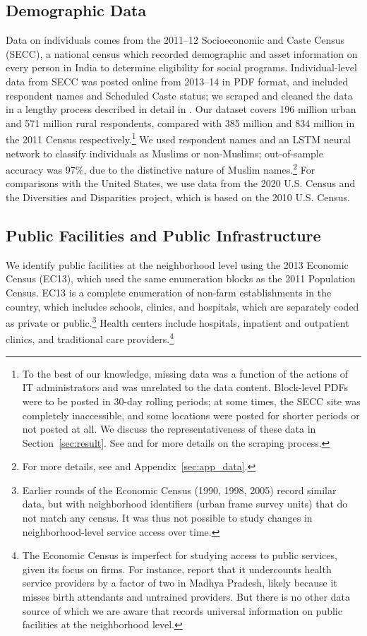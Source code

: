 \documentclass[12pt]{article}
\begin{document}
\subsection{Demographic Data}

Data on individuals comes from the 2011--12 Socioeconomic and Caste Census (SECC), a national census which recorded demographic and asset information on every person in India to determine eligibility for social programs. Individual-level data from SECC was posted online from 2013--14 in PDF format, and included respondent names and Scheduled Caste status; we scraped and cleaned the data in a lengthy process described in detail in \citet{asher2020rural}. Our dataset covers 196 million urban and 571 million rural respondents, compared with 385 million and 834 million in the 2011 Census respectively.\footnote{To the best of our knowledge, missing data was a function of the actions of IT administrators and was unrelated to the data content. Block-level PDFs were to be posted in 30-day rolling periods; at some times, the SECC site was completely inaccessible, and some locations were posted for shorter periods or not posted at all. We discuss the representativeness of these data in Section~\ref{sec:result}. See \citet{asher2020rural} and \citet{almn2019shrug} for more details on the scraping process.} We used respondent names and an LSTM neural network to classify individuals as Muslims or non-Muslims; out-of-sample accuracy was 97\%, due to the distinctive nature of Muslim names.\footnote{For more details, see \citet{ash2025} and Appendix~\ref{sec:app_data}.} For comparisons with the United States, we use data from the 2020 U.S. Census and the Diversities and Disparities project, which is based on the 2010 U.S. Census.

\subsection{Public Facilities and Public Infrastructure}

We identify public facilities at the neighborhood level using the 2013 Economic Census (EC13), which used the same enumeration blocks as the 2011 Population Census. EC13 is a complete enumeration of non-farm establishments in the country, which includes schools, clinics, and hospitals, which are separately coded as private or public.\footnote{Earlier rounds of the Economic Census (1990, 1998, 2005) record similar data, but with neighborhood identifiers (urban frame survey units) that do not match any census. It was thus not possible to study changes in neighborhood-level service access over time.} Health centers include hospitals, inpatient and outpatient clinics, and traditional care providers.\footnote{The Economic Census is imperfect for studying access to public services, given its focus on firms. For instance, \citet{das2022} report that it undercounts health service providers by a factor of two in Madhya Pradesh, likely because it misses birth attendants and untrained providers. But there is no other data source of which we are aware that records universal information on public facilities at the neighborhood level.}
\end{document}
